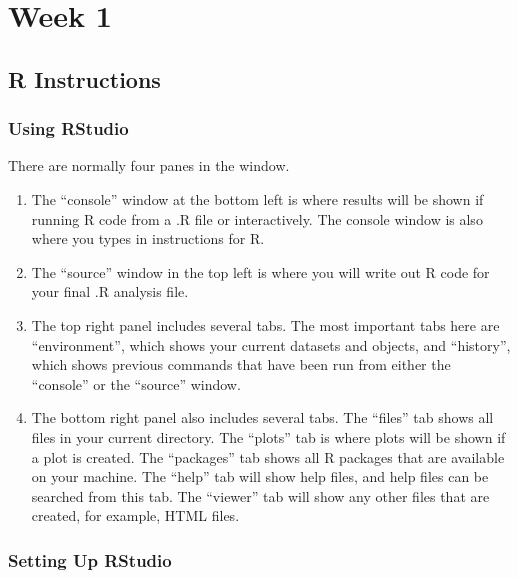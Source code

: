 \documentclass[]{book}
\begin{document}
\hypertarget{week-1-2}{%
\chapter{Week 1}\label{week-1-2}}

\hypertarget{r-instructions-7}{%
\section{R Instructions}\label{r-instructions-7}}

\hypertarget{using-rstudio-1}{%
\subsection{Using RStudio}\label{using-rstudio-1}}

There are normally four panes in the window.

\begin{enumerate}
\def\labelenumi{\arabic{enumi}.}
\item
  The ``console'' window at the bottom left is where results will be
  shown if running R code from a .R file or interactively. The console
  window is also where you types in instructions for R.
\item
  The ``source'' window in the top left is where you will write out R
  code for your final .R analysis file.
\item
  The top right panel includes several tabs. The most important tabs
  here are ``environment'', which shows your current datasets and
  objects, and ``history'', which shows previous commands that have been
  run from either the ``console'' or the ``source'' window.
\item
  The bottom right panel also includes several tabs. The ``files'' tab
  shows all files in your current directory. The ``plots'' tab is where
  plots will be shown if a plot is created. The ``packages'' tab shows
  all R packages that are available on your machine. The ``help'' tab
  will show help files, and help files can be searched from this tab.
  The ``viewer'' tab will show any other files that are created, for
  example, HTML files.
\end{enumerate}

\hypertarget{setting-up-rstudio-1}{%
\subsection{Setting Up RStudio}\label{setting-up-rstudio-1}}
\end{document}

